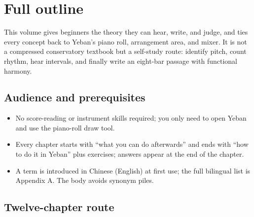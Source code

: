 \section*{Full outline}

This volume gives beginners the theory they can hear, write, and judge, and ties every concept back to Yeban's piano roll, arrangement area, and mixer. It is not a compressed conservatory textbook but a self-study route: identify pitch, count rhythm, hear intervals, and finally write an eight-bar passage with functional harmony.

\subsection*{Audience and prerequisites}

\begin{itemize}
  \item No score-reading or instrument skills required; you only need to open Yeban and use the piano-roll draw tool.
  \item Every chapter starts with ``what you can do afterwards'' and ends with ``how to do it in Yeban'' plus exercises; answers appear at the end of the chapter.
  \item A term is introduced in Chinese (English) at first use; the full bilingual list is Appendix A. The body avoids synonym piles.
\end{itemize}

\subsection*{Twelve-chapter route}


